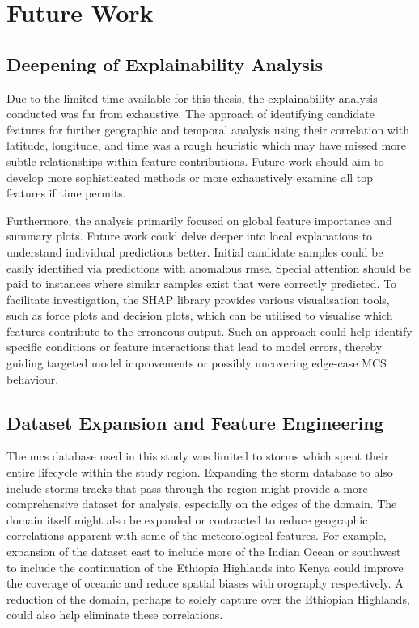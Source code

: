 \section{Future Work}
\label{sec:future-work}

\subsection{Deepening of Explainability Analysis}

Due to the limited time available for this thesis, the explainability analysis conducted was far from exhaustive. The approach of identifying candidate features for further geographic and temporal analysis using their correlation with latitude, longitude, and time was a rough heuristic which may have missed more subtle relationships within feature contributions. Future work should aim to develop more sophisticated methods or more exhaustively examine all top features if time permits.

Furthermore, the analysis primarily focused on global feature importance and summary plots. Future work could delve deeper into local explanations to understand individual predictions better. Initial candidate samples could be easily identified via predictions with anomalous \acrshort{rmse}. Special attention should be paid to instances where similar samples exist that were correctly predicted. To facilitate investigation, the SHAP library provides various visualisation tools, such as force plots and decision plots, which can be utilised to visualise which features contribute to the erroneous output. Such an approach could help identify specific conditions or feature interactions that lead to model errors, thereby guiding targeted model improvements or possibly uncovering edge-case MCS behaviour.

\subsection{Dataset Expansion and Feature Engineering}

The \acrshort{mcs} database used in this study was limited to storms which spent their entire lifecycle within the study region. Expanding the storm database to also include storms tracks that pass through the region might provide a more comprehensive dataset for analysis, especially on the edges of the domain. The domain itself might also be expanded or contracted to reduce geographic correlations apparent with some of the meteorological features. For example, expansion of the dataset east to include more of the Indian Ocean or southwest to include the continuation of the Ethiopia Highlands into Kenya could improve the coverage of oceanic  and reduce spatial biases with orography respectively. A reduction of the domain, perhaps to solely capture  over the Ethiopian Highlands, could also help eliminate these correlations.

